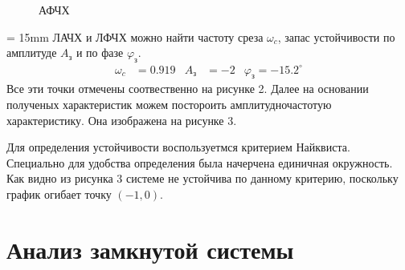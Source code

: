 \documentclass[a4paper, 12pt]{article}
\begin{document}
\newpage
\hspace*{-\parindent}%
\begin{minipage}[t]{0.4\textwidth}
    \vspace{-1cm}
    \begin{figure}[H]
    \centering
    \caption{АФЧХ}
    \end{figure}
\end{minipage}
\begin{minipage}[t]{0.6\textwidth}
    \parindent = 15mm
     ЛАЧХ и ЛФЧХ можно найти частоту среза $\omega_c$, запас устойчивости по амплитуде $A_\text{з}$ и по фазе $\varphi_\text{з}$.
    \begin{align*}
        \omega_c & = 0.919 & A_\text{з} & = -2 & \varphi_\text{з} = -15.2^\circ
    \end{align*}
    Все эти точки отмечены соотвественно на рисунке 2. Далее на основании полученых характеристик можем постороить амплитудночастотую характеристику. Она изображена на рисунке 3. \par
    Для определения устойчивости воспользуетмся критерием Найквиста. Специально для удобства определения была начерчена единичная окружность. Как видно из рисунка 3 системе не устойчива по данному критерию, поскольку график огибает точку $(-1, 0)$.
\end{minipage}

\newpage
\section{Анализ замкнутой системы}
\end{document}
